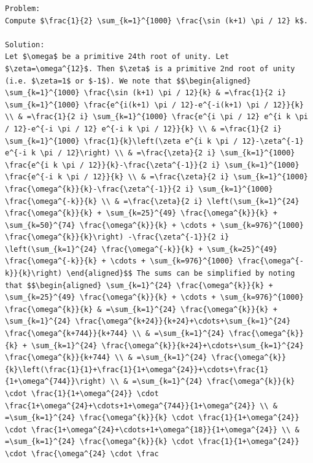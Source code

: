 \documentclass[11pt]{article}
\begin{document}
\begin{lstlisting}[style=modeloutput]
Problem:
Compute $\frac{1}{2} \sum_{k=1}^{1000} \frac{\sin (k+1) \pi / 12} k$.

Solution:
Let $\omega$ be a primitive 24th root of unity. Let $\zeta=\omega^{12}$. Then $\zeta$ is a primitive 2nd root of unity (i.e. $\zeta=1$ or $-1$). We note that $$\begin{aligned} \sum_{k=1}^{1000} \frac{\sin (k+1) \pi / 12}{k} & =\frac{1}{2 i} \sum_{k=1}^{1000} \frac{e^{i(k+1) \pi / 12}-e^{-i(k+1) \pi / 12}}{k} \\ & =\frac{1}{2 i} \sum_{k=1}^{1000} \frac{e^{i \pi / 12} e^{i k \pi / 12}-e^{-i \pi / 12} e^{-i k \pi / 12}}{k} \\ & =\frac{1}{2 i} \sum_{k=1}^{1000} \frac{1}{k}\left(\zeta e^{i k \pi / 12}-\zeta^{-1} e^{-i k \pi / 12}\right) \\ & =\frac{\zeta}{2 i} \sum_{k=1}^{1000} \frac{e^{i k \pi / 12}}{k}-\frac{\zeta^{-1}}{2 i} \sum_{k=1}^{1000} \frac{e^{-i k \pi / 12}}{k} \\ & =\frac{\zeta}{2 i} \sum_{k=1}^{1000} \frac{\omega^{k}}{k}-\frac{\zeta^{-1}}{2 i} \sum_{k=1}^{1000} \frac{\omega^{-k}}{k} \\ & =\frac{\zeta}{2 i} \left(\sum_{k=1}^{24} \frac{\omega^{k}}{k} + \sum_{k=25}^{49} \frac{\omega^{k}}{k} + \sum_{k=50}^{74} \frac{\omega^{k}}{k} + \cdots + \sum_{k=976}^{1000} \frac{\omega^{k}}{k}\right) -\frac{\zeta^{-1}}{2 i} \left(\sum_{k=1}^{24} \frac{\omega^{-k}}{k} + \sum_{k=25}^{49} \frac{\omega^{-k}}{k} + \cdots + \sum_{k=976}^{1000} \frac{\omega^{-k}}{k}\right) \end{aligned}$$ The sums can be simplified by noting that $$\begin{aligned} \sum_{k=1}^{24} \frac{\omega^{k}}{k} + \sum_{k=25}^{49} \frac{\omega^{k}}{k} + \cdots + \sum_{k=976}^{1000} \frac{\omega^{k}}{k} & =\sum_{k=1}^{24} \frac{\omega^{k}}{k} + \sum_{k=1}^{24} \frac{\omega^{k+24}}{k+24}+\cdots+\sum_{k=1}^{24} \frac{\omega^{k+744}}{k+744} \\ & =\sum_{k=1}^{24} \frac{\omega^{k}}{k} + \sum_{k=1}^{24} \frac{\omega^{k}}{k+24}+\cdots+\sum_{k=1}^{24} \frac{\omega^{k}}{k+744} \\ & =\sum_{k=1}^{24} \frac{\omega^{k}}{k}\left(\frac{1}{1}+\frac{1}{1+\omega^{24}}+\cdots+\frac{1}{1+\omega^{744}}\right) \\ & =\sum_{k=1}^{24} \frac{\omega^{k}}{k} \cdot \frac{1}{1+\omega^{24}} \cdot \frac{1+\omega^{24}+\cdots+1+\omega^{744}}{1+\omega^{24}} \\ & =\sum_{k=1}^{24} \frac{\omega^{k}}{k} \cdot \frac{1}{1+\omega^{24}} \cdot \frac{1+\omega^{24}+\cdots+1+\omega^{18}}{1+\omega^{24}} \\ & =\sum_{k=1}^{24} \frac{\omega^{k}}{k} \cdot \frac{1}{1+\omega^{24}} \cdot \frac{\omega^{24} \cdot \frac
\end{lstlisting}
\clearpage
\end{document}

